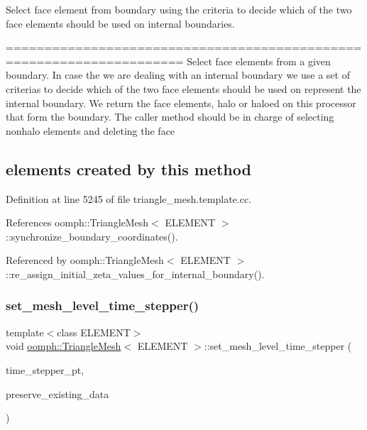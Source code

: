 Select face element from boundary using the criteria to decide which of the two face elements should be used on internal boundaries. 

===================================================================== Select face elements from a given boundary. In case the we are dealing with an internal boundary we use a set of criterias to decide which of the two face elements should be used on represent the internal boundary. We return the face elements, halo or haloed on this processor that form the boundary. The caller method should be in charge of selecting nonhalo elements and deleting the face \subsection*{elements created by this method }

Definition at line 5245 of file triangle\+\_\+mesh.\+template.\+cc.



References oomph\+::\+Triangle\+Mesh$<$ E\+L\+E\+M\+E\+N\+T $>$\+::synchronize\+\_\+boundary\+\_\+coordinates().



Referenced by oomph\+::\+Triangle\+Mesh$<$ E\+L\+E\+M\+E\+N\+T $>$\+::re\+\_\+assign\+\_\+initial\+\_\+zeta\+\_\+values\+\_\+for\+\_\+internal\+\_\+boundary().

\mbox{\label{classoomph_1_1TriangleMesh_abb1a6cb242b5d0e067a8e64b3ac50cfb}} 
\subsubsection{\texorpdfstring{set\+\_\+mesh\+\_\+level\+\_\+time\+\_\+stepper()}{set\_mesh\_level\_time\_stepper()}}
{\footnotesize\ttfamily template$<$class E\+L\+E\+M\+E\+NT$>$ \\
void \hyperlink{classoomph_1_1TriangleMesh}{oomph\+::\+Triangle\+Mesh}$<$ E\+L\+E\+M\+E\+NT $>$\+::set\+\_\+mesh\+\_\+level\+\_\+time\+\_\+stepper (\begin{DoxyParamCaption}\item[{Time\+Stepper $\ast$const \&}]{time\+\_\+stepper\+\_\+pt,  }\item[{const bool \&}]{preserve\+\_\+existing\+\_\+data }\end{DoxyParamCaption})\hspace{0.3cm}{\ttfamily [inline]}}



